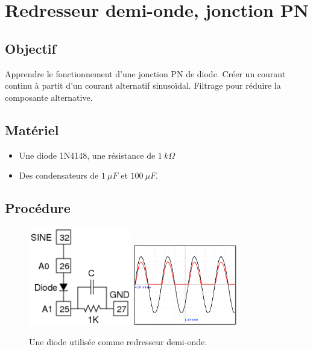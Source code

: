 \documentclass{book}
\begin{document}

\section{Redresseur demi-onde, jonction PN}



\subsection{Objectif}


Apprendre le fonctionnement d'une jonction PN de diode. Créer un courant continu à partit d'un courant alternatif sinusoïdal. Filtrage pour réduire la composante alternative.




\subsection{Matériel}


\begin{itemize}
  \item Une diode 1N4148, une résistance de $1\ k\Omega$
  \item Des condensateurs de $1\ \mu F$ et $100\ \mu F$.
\end{itemize}

\subsection{Procédure}


\begin{figure}[h!]
\begin{center}
\caption{\label{fig:Diode-rectifier}Une diode utilisée comme redresseur demi-onde. }\vspace{0.5em}
\includegraphics[width=0.4\textwidth, height=0.3\textwidth, keepaspectratio]{Schematic-half-wave.png}
\includegraphics[width=0.4\textwidth, height=0.3\textwidth, keepaspectratio]{Pic-diode-halfwave.png}
\end{center}
\end{figure}
\end{document}
